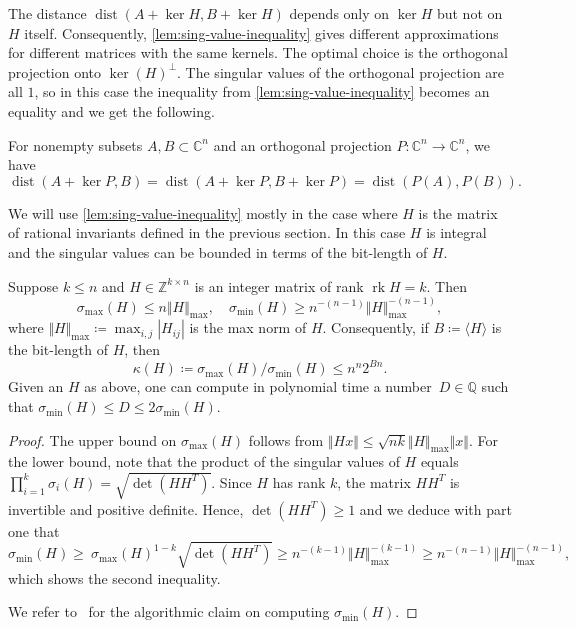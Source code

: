 \documentclass[a4paper,USenglish,cleveref,numberwithinsect]{lipics-v2021}
\DeclareMathOperator{\rk}{rk}
\DeclareMathOperator{\dist}{dist}
\newcommand{\QQ}{\mathbb{Q}}
\newcommand{\CC}{\mathbb{C}}
\newcommand{\ZZ}{\mathbb{Z}}
\numberwithin{equation}{section}
\begin{document}
The distance $\dist(A+\ker H, B+\ker H)$ depends only on $\ker H$ but not on $H$ itself.
Consequently, \cref{lem:sing-value-inequality} gives different approximations for different matrices with the same kernels.
The optimal choice is the orthogonal projection onto $\ker(H)^\perp$.
The singular values of the orthogonal projection are all $1$, so in this case the inequality from \cref{lem:sing-value-inequality}
becomes an equality and we get the following.

\begin{corollary}\label{cor:ort-proj-dist}
For nonempty subsets $A,B\subset\CC^n$ and an orthogonal projection $P:\CC^n\rightarrow \CC^n$, we have
\[
  \dist(A+\ker P, B ) = \dist(A+\ker P, B+\ker P ) = \dist(P(A), P(B) ).
\]
\end{corollary}

We will use \cref{lem:sing-value-inequality} mostly in the case where $H$ is the matrix of rational invariants
defined in the previous section. In this case $H$ is integral and the singular values can be bounded
in terms of the bit-length of $H$.

\begin{lemma}
\label{lem:singular}
Suppose $k\leq n$ and $H\in\ZZ^{k\times n}$ is an integer matrix of rank $\rk H=k$. Then
\[
   \sigma_{\max}(H)\leq n \Vert H\Vert_{\max},\quad \sigma_{\min}(H) \geq n^{-(n-1)} \Vert H\Vert_{\max}^{-(n-1)},
\]
where $\Vert H\Vert_{\max}\coloneqq\max_{i,j}|H_{ij}|$ is the max norm of $H$.
Consequently, if $B\coloneqq\langle H\rangle$ is the bit-length of $H$, then
\[
     \kappa(H)\coloneqq \sigma_{\max}(H)/\sigma_{\min}(H) \leq n^n 2^{Bn}.
\]
Given an $H$ as above, one can compute in polynomial time a number~$D\in\QQ$ such that
$\sigma_{\min}(H) \le D \le 2 \sigma_{\min}(H)$.
\end{lemma}

\begin{proof}
The upper bound on $\sigma_{\max}(H)$ follows from
$\Vert Hx\Vert  \leq  \sqrt{nk}\Vert H\Vert_{\max} \Vert x\Vert $.
For the lower bound, note that the product of the singular values of $H$ equals
$\prod_{i=1}^k \sigma_i(H)=\sqrt{\det(HH^T)}$.
Since $H$ has rank $k$, the matrix $HH^T$ is invertible and positive definite.
Hence, $\det(HH^T)\geq 1$ and we deduce with part one that
\[
  \sigma_{\min}(H) \geq \  \sigma_{\max}(H)^{1-k}  \sqrt{\det(HH^T)} \geq n^{-(k-1)}\Vert H\Vert_{\max}^{-(k-1)}
    \geq n^{-(n-1)}\Vert H\Vert_{\max}^{-(n-1)},
\]
which shows the second inequality.

We refer to~\cite{pan-chen:99} for the algorithmic claim on computing $\sigma_{\min}(H)$.
\end{proof}
\end{document}
